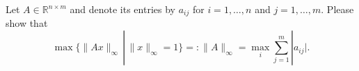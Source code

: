 	Let $A\in\mathbb{R}^{n\times m}$ and denote its entries by $a_{ij}$ for $i = 1,\dots,n$ and $j=1,\dots,m$.
	Please show that
	 $$\max \lbrace \| Ax \|_\infty \,|\, \|x\|_\infty = 1 \rbrace =: \| A \|_\infty = \max\limits_{i} \sum_{j=1}^{m} |a_{ij}|.$$
